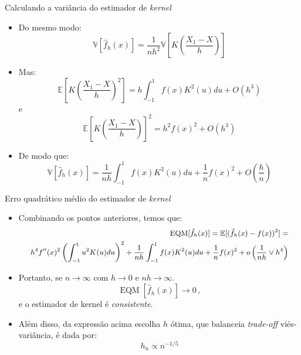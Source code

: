\documentclass[11pt]{beamer}
\begin{document}
	\begin{frame}{Calculando a variância do estimador de \textit{kernel}}
		\begin{itemize}
			\item Do mesmo modo:
			$$		\mathbb{V}[\hat{f}_h(x)] = \frac{1}{nh^2}\mathbb{V}\left[K\left(\frac{X_1 - X}{h}\right)\right]$$
			\item Mas:
			$$\mathbb{E}\left[K\left(\frac{X_1 - X}{h}\right)^2\right] = h \int_{-1}^{1} f(x) K^2(u) du + O(h^3)$$
			e$$\mathbb{E}\left[K\left(\frac{X_1 - X}{h}\right)\right]^2 = h^2f(x)^2  + O(h^3)$$
			\item De modo que:
			$$\mathbb{V}[\hat{f}_h(x)] = \frac{1}{nh} \int_{-1}^{1} f(x) K^2(u) du+ \frac{1}{n}f(x)^2 + O\left(\frac{h}{n}\right)$$		
		\end{itemize}
		

	\end{frame}
	\begin{frame}{Erro quadrático médio do estimador de \textit{kernel}}
		\begin{itemize}
			\item Combinando os pontos anteriores, temos que:
			\begin{equation*}
				\small 
				\begin{aligned}
					\operatorname{EQM}[\hat{f}_h(x)] = \mathbb{E}[(\hat{f}_h(x) - f(x))^2] = \\ 
					h^4 f''(x)^2 \left(\int_{-1}^{1}u^2 K(u)du\right)^2 + \frac{1}{nh} \int_{-1}^{1} f(x) K^2(u) du+ \frac{1}{n}f(x)^2 + o\left(\frac{1}{nh} \lor h^4\right)
				\end{aligned}
			\end{equation*}
			\item Portanto, se $n \to \infty$ com $h\to 0$ e $nh \to \infty$.
			$$\operatorname{EQM}[\hat{f}_h(x)] \to 0\, ,$$
			e o estimador de kernel é \textit{consistente}.
			\item Além disso, da expressão acima escolha $h$ ótima, que balanceia \textit{trade-off} viés-variância,  é dada por:
			$$h_n \propto n^{-1/5} $$ 
			
		\end{itemize}
	\end{frame}
\end{document}
